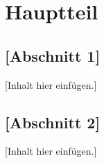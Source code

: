 \chapter{Hauptteil}
\label{chap:hauptteil}

\section{[Abschnitt 1]}

[Inhalt hier einfügen.]

\section{[Abschnitt 2]}

[Inhalt hier einfügen.]
